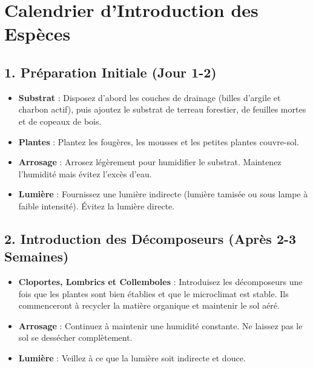 \section*{Calendrier d'Introduction des Espèces}

\subsection*{1. Préparation Initiale (Jour 1-2)}
\begin{itemize}
    \item \textbf{Substrat} : Disposez d'abord les couches de drainage (billes d'argile et charbon actif), puis ajoutez le substrat de terreau forestier, de feuilles mortes et de copeaux de bois.
    \item \textbf{Plantes} : Plantez les fougères, les mousses et les petites plantes couvre-sol.
    \item \textbf{Arrosage} : Arrosez légèrement pour humidifier le substrat. Maintenez l'humidité mais évitez l'excès d'eau.
    \item \textbf{Lumière} : Fournissez une lumière indirecte (lumière tamisée ou sous lampe à faible intensité). Évitez la lumière directe.
\end{itemize}

\subsection*{2. Introduction des Décomposeurs (Après 2-3 Semaines)}
\begin{itemize}
    \item \textbf{Cloportes, Lombrics et Collemboles} : Introduisez les décomposeurs une fois que les plantes sont bien établies et que le microclimat est stable. Ils commenceront à recycler la matière organique et maintenir le sol aéré.
    \item \textbf{Arrosage} : Continuez à maintenir une humidité constante. Ne laissez pas le sol se dessécher complètement.
    \item \textbf{Lumière} : Veillez à ce que la lumière soit indirecte et douce.
\end{itemize}

